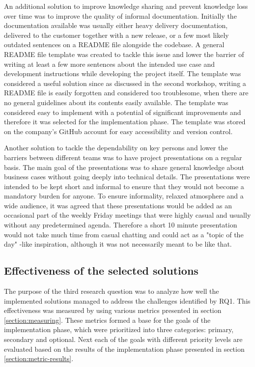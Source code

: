 An additional solution to improve knowledge sharing and prevent knowledge loss over time was to improve the quality of informal documentation. Initially the documentation available was usually either heavy delivery
documentation, delivered to the customer together with a new release, or a few most likely outdated sentences on a README file alongside the codebase. A general README file template was created to tackle
this issue and lower the barrier of writing at least a few more sentences about the intended use case and development instructions while developing the project itself. The template was considered a useful solution
since as discussed in the second workshop, writing a README file is easily forgotten and considered too troublesome, when there are no general guidelines about its contents easily available. The template was
considered easy to implement with a potential of significant improvements and therefore it was selected for the implementation phase. The template was stored on the company's GitHub account for easy accessibility
and version control.

Another solution to tackle the dependability on key persons and lower the barriers between different teams was to have project presentations on a regular basis. The main goal of the presentations was to
share general knowledge about business cases without going deeply into technical details. The presentations were intended to be kept short and informal to ensure that they would not become a mandatory burden
for anyone. To ensure informality, relaxed atmosphere and a wide audience, it was agreed that these presentations would be added as an occasional part of the weekly Friday meetings that were highly casual and usually without any
predetermined agenda. Therefore a short 10 minute presentation would not take much time from casual chatting and could act as a "topic of the day" -like inspiration, although it was not necessarily meant to
be like that.
	
\subsection{Effectiveness of the selected solutions}

The purpose of the third research question was to analyze how well the implemented solutions managed to address the challenges identified by RQ1. This effectiveness was measured by
using various metrics presented in section \ref{section:measuring}.
These metrics formed a base for the goals of the implementation phase, which were prioritized into three categories: primary, secondary and optional. Next
each of the goals with different priority levels are evaluated based on the results of the implementation phase presented in section \ref{section:metric-results}.

